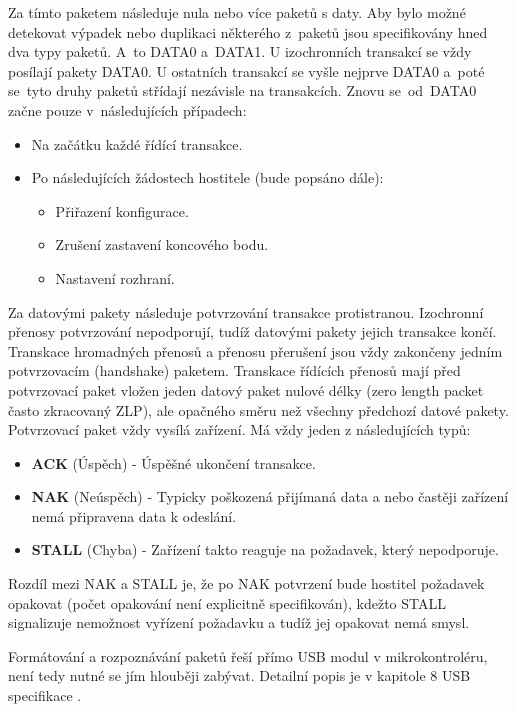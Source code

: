 Za tímto paketem následuje nula nebo více paketů s daty. Aby bylo možné detekovat výpadek nebo duplikaci některého z~paketů jsou specifikovány hned dva typy paketů. A~to DATA0 a~DATA1. U izochronních transakcí se vždy posílají pakety DATA0. U ostatních transakcí se vyšle nejprve DATA0 a~poté se~tyto druhy paketů střídají nezávisle na transakcích. Znovu se~od~DATA0 začne pouze v~následujících případech:
\begin{itemize}
\item Na začátku každé řídící transakce.
\item Po následujících žádostech hostitele (bude popsáno dále):
\begin{itemize}
\item Přiřazení konfigurace.
\item Zrušení zastavení koncového bodu.
\item Nastavení rozhraní.
\end{itemize}
\end{itemize}
Za datovými pakety následuje potvrzování transakce protistranou. Izochronní přenosy potvrzování nepodporují, tudíž datovými pakety jejich transakce končí. Transkace hromadných přenosů a přenosu přerušení jsou vždy zakončeny jedním potvrzovacím (handshake) paketem.  Transkace řídících přenosů mají před potvrzovací paket vložen jeden datový paket nulové délky (zero length packet často zkracovaný ZLP), ale opačného směru než všechny předchozí datové pakety. Potvrzovací paket vždy vysílá zařízení. Má vždy jeden z následujících typů:
\begin{itemize}
\item \textbf{ACK} (Úspěch) - Úspěšné ukončení transakce.
\item \textbf{NAK} (Neúspěch) - Typicky poškozená přijímaná data a nebo častěji zařízení nemá připravena data k odeslání.
\item \textbf{STALL} (Chyba) - Zařízení takto reaguje na požadavek, který nepodporuje.
\end{itemize}
Rozdíl mezi NAK a STALL je, že po NAK potvrzení bude hostitel požadavek opakovat (počet opakování není explicitně specifikován), kdežto STALL signalizuje nemožnost vyřízení požadavku a tudíž jej opakovat nemá smysl.

Formátování a rozpoznávání paketů řeší přímo USB modul v mikrokontroléru, není tedy nutné se jím hlouběji zabývat. Detailní popis je v kapitole 8 USB specifikace \cite{usb-spec}.


